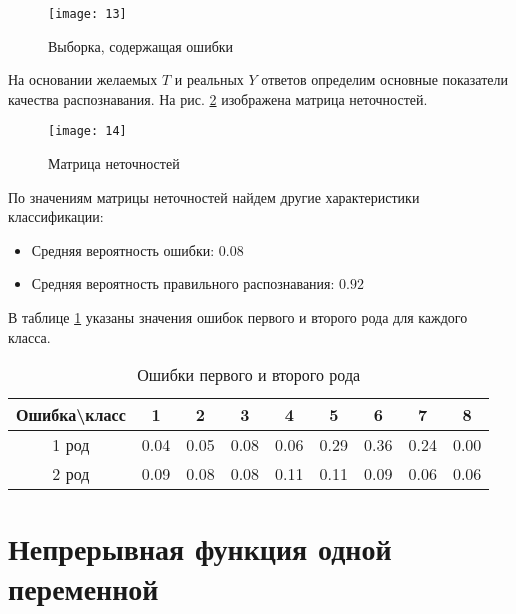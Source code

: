 \begin{figure}[H]
\begin{center}
	\texttt{[image: 13]}
	\caption{Выборка, содержащая ошибки}
	\label{fig:eight_classes_noise}
\end{center}
\end{figure}

На основании желаемых $T$ и реальных $Y$ ответов определим основные показатели качества распознавания. На рис. \ref{fig:eight_classes_conf_matrix} изображена матрица неточностей.

\begin{figure}[H]
\begin{center}
	\texttt{[image: 14]}
	\caption{Матрица неточностей}
	\label{fig:eight_classes_conf_matrix}
\end{center}
\end{figure}

По значениям матрицы неточностей найдем другие характеристики классификации:
\begin{itemize}
	\setlength\itemsep{0em}
	\item Средняя вероятность ошибки: $0.08$
	\item Средняя вероятность правильного распознавания: $0.92$
\end{itemize}

В таблице \ref{tab:eight_classes_errors} указаны значения ошибок первого и второго рода для каждого класса.

\vspace{-0.5cm}
\begin{table}[H]
\begin{center}
	\begin{tabular}{|c|c|c|c|c|c|c|c|c|}
		\hline
		Ошибка\textbackslash класс & 1 & 2 & 3 & 4 & 5 & 6 & 7 & 8 \\ 
		\hline
		1 род & 0.04 & 0.05 & 0.08 & 0.06 & 0.29 & 0.36 & 0.24 & 0.00 \\ 
		\hline
		2 род & 0.09 & 0.08 & 0.08 & 0.11 & 0.11 & 0.09 & 0.06 & 0.06 \\ 
		\hline
	\end{tabular}
	\caption{Ошибки первого и второго рода}
	\label{tab:eight_classes_errors}
\end{center}
\end{table}

\section{Непрерывная функция одной переменной}

